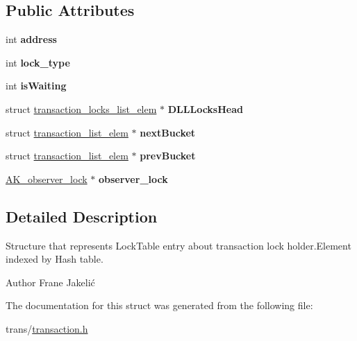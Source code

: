 \subsection*{Public Attributes}
\begin{DoxyCompactItemize}
\item 
\mbox{\label{structtransaction__list__elem_abcf5dc09e2f778fed1d8a7cf7055004f}} 
int {\bfseries address}
\item 
\mbox{\label{structtransaction__list__elem_accb49854309cdff0a157d4ab01ac43fc}} 
int {\bfseries lock\+\_\+type}
\item 
\mbox{\label{structtransaction__list__elem_a0a732924a2e5cbe3b8568e0e5212f36e}} 
int {\bfseries is\+Waiting}
\item 
\mbox{\label{structtransaction__list__elem_a441dcf09223b92668cadc49f88b08bc6}} 
struct \hyperlink{structtransaction__locks__list__elem}{transaction\+\_\+locks\+\_\+list\+\_\+elem} $\ast$ {\bfseries D\+L\+L\+Locks\+Head}
\item 
\mbox{\label{structtransaction__list__elem_a87886aa53e90ddd43a7b6c774c2b801f}} 
struct \hyperlink{structtransaction__list__elem}{transaction\+\_\+list\+\_\+elem} $\ast$ {\bfseries next\+Bucket}
\item 
\mbox{\label{structtransaction__list__elem_aac101a113a925aa7e9dd75fc15563204}} 
struct \hyperlink{structtransaction__list__elem}{transaction\+\_\+list\+\_\+elem} $\ast$ {\bfseries prev\+Bucket}
\item 
\mbox{\label{structtransaction__list__elem_a419ed68310e5b4fffd6629af6512a320}} 
\hyperlink{structobserver__lock}{A\+K\+\_\+observer\+\_\+lock} $\ast$ {\bfseries observer\+\_\+lock}
\end{DoxyCompactItemize}


\subsection{Detailed Description}
Structure that represents Lock\+Table entry about transaction lock holder.\+Element indexed by Hash table. 

\begin{DoxyAuthor}{Author}
Frane Jakelić 
\end{DoxyAuthor}


The documentation for this struct was generated from the following file\+:\begin{DoxyCompactItemize}
\item 
trans/\hyperlink{transaction_8h}{transaction.\+h}\end{DoxyCompactItemize}
